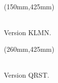 \documentclass[a0, portrait]{a0poster}
\begin{document}
\begin{textblock*}{110mm}(150mm,425mm)
\begin{center}
 \\
\small Version KLMN.
\end{center}
\end{textblock*}

\begin{textblock*}{110mm}(260mm,425mm)
\begin{center}
 \\
\small Version QRST.
\end{center}
\end{textblock*}
\end{document}
